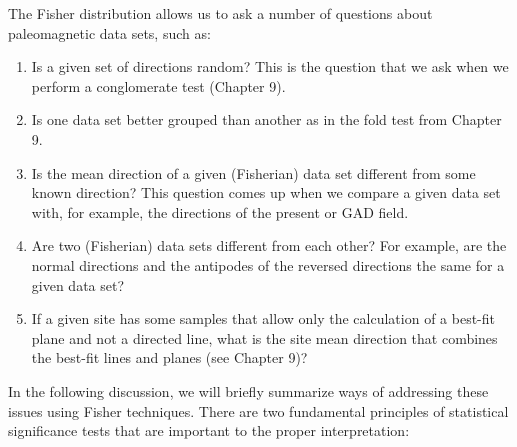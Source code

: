 The Fisher distribution allows us to ask a number of questions about paleomagnetic data sets, such as:

\begin{enumerate}
\item Is a given set of directions random?  This is the question that we ask when we perform a conglomerate test (Chapter  9).

\item Is one data set better grouped than another as in the fold test from Chapter 9. 

\item Is the mean direction of a given (Fisherian) data set 
different from some known direction?  This question comes up when we compare a given data set with, for example, the directions of the present or GAD field.

\item Are two (Fisherian) data sets different from each other?  For example, are the normal directions and the antipodes of the reversed directions the same for a given data set?

\item If a given site has some samples that allow only the calculation of a
best-fit plane and not a directed line, what is the site mean direction
that 
combines the best-fit lines and planes (see Chapter  9)?   

\end{enumerate}

In the following discussion, we will briefly summarize ways of addressing these issues
using Fisher techniques.    There are two fundamental principles of statistical significance tests that are important to the proper
interpretation:

